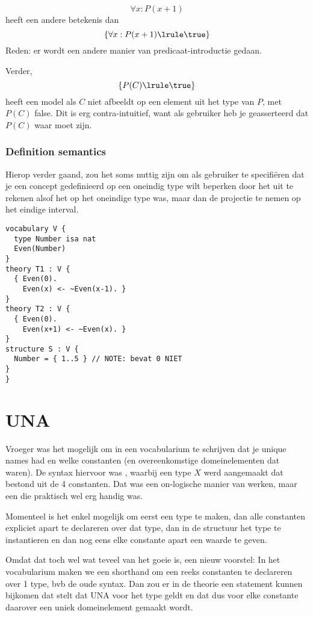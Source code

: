 \documentclass{article}
\begin{document}
\[\forall x: P(x+1)\]
heeft een andere betekenis dan
\[\{\forall x: P(x+1) \lrule \true \}\]
Reden: er wordt een andere manier van predicaat-introductie gedaan.

Verder, \[\{P(C) \lrule \true \}\] heeft een model als $C$ niet afbeeldt op een element uit het type van $P$, met $P(C)$ false. Dit is erg contra-intuitief, want als gebruiker heb je geasserteerd dat $P(C)$ waar moet zijn.

\subsubsection{Definition semantics}
Hierop verder gaand, zou het soms nuttig zijn om als gebruiker te specifi\"eren dat je een concept gedefinieerd op een oneindig type wilt beperken door het uit te rekenen alsof het op het oneindige type was, maar dan de projectie te nemen op het eindige interval.

\begin{lstlisting}
vocabulary V {
  type Number isa nat
  Even(Number)
}
theory T1 : V {
  { Even(0).
    Even(x) <- ~Even(x-1). }
}
theory T2 : V {
  { Even(0).
    Even(x+1) <- ~Even(x). }
}
structure S : V {
  Number = { 1..5 } // NOTE: bevat 0 NIET
}
}
\end{lstlisting}


\section{UNA}
Vroeger was het mogelijk om in een vocabularium te schrijven dat je unique names had en welke constanten (en overeenkomstige domeinelementen dat waren).
De syntax hiervoor was , waarbij een type $X$ werd aangemaakt dat bestond uit de 4 constanten.
Dat was een on-logische manier van werken, maar een die praktisch wel erg handig was.

Momenteel is het enkel mogelijk om eerst een type te maken, dan alle constanten expliciet apart te declareren over dat type, dan in de structuur het type te instantieren en dan nog eens elke constante apart een waarde te geven.

Omdat dat toch wel wat teveel van het goeie is, een nieuw voorstel:
In het vocabularium maken we een shorthand om een reeks constanten te declareren over 1 type, bvb de oude syntax.
Dan zou er in de theorie een statement kunnen bijkomen dat stelt dat UNA voor het type geldt en dat dus voor elke constante daarover een uniek domeinelement gemaakt wordt.
\end{document}
